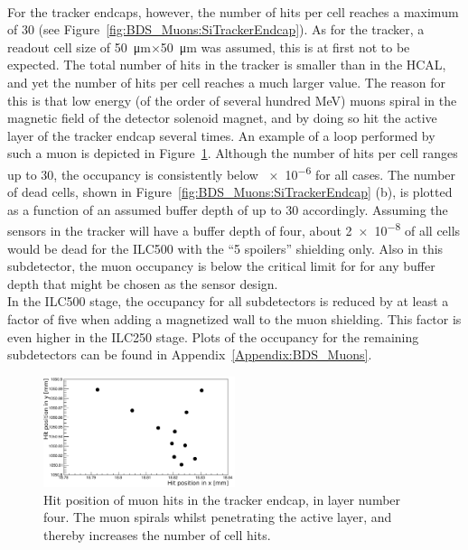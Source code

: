 \\For the \sid tracker endcaps, however, the number of hits per cell reaches a maximum of 30 (see Figure~\ref{fig:BDS_Muons:SiTrackerEndcap}).
As for the \sid tracker, a readout cell size of \SI{50}{\micro\meter}$\times$\SI{50}{\micro\meter} was assumed, this is at first not to be expected.
The total number of hits in the tracker is smaller than in the HCAL, and yet the number of hits per cell reaches a much larger value.
The reason for this is that low energy (of the order of several hundred MeV) muons spiral in the magnetic field of the detector solenoid magnet, and by doing so hit the active layer of the tracker endcap several times.
An example of a loop performed by such a muon is depicted in Figure~\ref{fig:BDS_Muons:loop}.
Although the number of hits per cell ranges up to 30, the occupancy is consistently below \num{e-6} for all cases.
The number of dead cells, shown in Figure~\ref{fig:BDS_Muons:SiTrackerEndcap} (b), is plotted as a function of an assumed buffer depth of up to 30 accordingly.
Assuming the sensors in the \sid tracker will have a buffer depth of four, about \num{2e-8} of all cells would be dead for the ILC500 with the ``5 spoilers'' shielding only.
Also in this subdetector, the muon occupancy is below the critical limit for \sid for any buffer depth that might be chosen as the sensor design.
\\In the ILC500 stage, the occupancy for all subdetectors is reduced by at least a factor of five when adding a magnetized wall to the muon shielding.
This factor is even higher in the ILC250 stage.
Plots of the occupancy for the remaining \sid subdetectors can be found in Appendix~\ref{Appendix:BDS_Muons}.
 \begin{figure}[htbp!]
\centering
\includegraphics[width=0.5\textwidth]{Figures/BDS_muons/LoopInACell.png}
\caption[BDS muons looping]{Hit position of muon hits in the \sid tracker endcap, in layer number four.
The muon spirals whilst penetrating the active layer, and thereby increases the number of cell hits. }
\label{fig:BDS_Muons:loop}
\end{figure}

